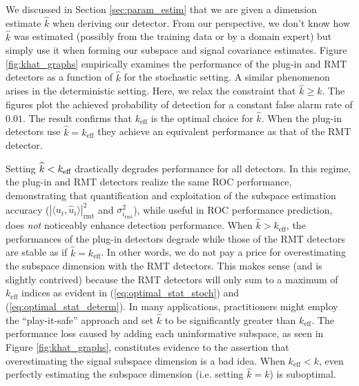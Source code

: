 We discussed in Section \ref{sec:param_estim} that we are given a dimension estimate
$\widehat{k}$ when deriving our detector. From our perspective, we don't know how
$\widehat{k}$ was estimated (possibly from the training data or by a domain expert) but
simply use it when forming our subspace and signal covariance estimates. Figure
\ref{fig:khat_graphs} empirically examines the performance of the plug-in and RMT detectors
as a function of $\widehat{k}$ for the stochastic setting. A similar phenomenon arises in
the deterministic setting. Here, we relax the constraint that $\widehat{k}\geq k$. The figures plot the achieved probability of detection for a constant false alarm rate of $0.01$. The result confirms that $k_\text{eff}$ is the optimal choice for $\widehat{k}$. When the plug-in detectors use $\widehat{k} = k_\text{eff}$ they achieve an equivalent performance as that of the RMT detector.

Setting $\widehat{k} < k_\text{eff}$ drastically degrades performance for all detectors. In this regime, the plug-in and RMT detectors realize the same ROC performance, demonstrating that quantification and exploitation of the subspace estimation accuracy ($|\langle u_i,\widehat{u}_i\rangle |^2_{\text{rmt}}$ and $\sigma_{i_\text{rmt}}^2$), while useful in ROC performance prediction, does \textit{not} noticeably enhance detection performance. When $\widehat{k} > k_\text{eff}$, the performances of the plug-in detectors degrade while those of the RMT detectors are stable as if $\widehat{k}=k_\text{eff}$. In other words, we do not pay a price for overestimating the subspace dimension with the RMT detectors. This makes sense (and is slightly contrived) because the RMT detectors will only sum to a maximum of $k_\text{eff}$ indices as evident in (\ref{eq:optimal_stat_stoch}) and (\ref{eq:optimal_stat_determ}). In many applications, practitioners might employ the ``play-it-safe'' approach and set $\widehat{k}$ to be significantly greater than $k_\text{eff}$. The performance loss caused by adding each uninformative subspace, as seen in Figure \ref{fig:khat_graphs}, constitutes evidence to the assertion that overestimating the signal subspace dimension is a bad idea. When $k_\text{eff} < k$, even perfectly estimating the subspace dimension (i.e. setting $\widehat{k} = k$) is suboptimal.
